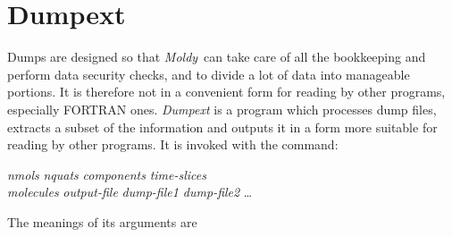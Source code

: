 \documentclass[a4paper,twoside]{report}
\newcommand{\moldy}{\emph{Moldy}}
\begin{document}
\section{Dumpext}%
Dumps are designed so that \moldy\ can take care of all the
bookkeeping and perform data security checks, and to divide a lot of data
into manageable portions.  It is therefore not in a convenient form
for reading by other programs, especially FORTRAN ones.
\emph{Dumpext} is a program which processes dump files, extracts a
subset of the information and outputs it in a form more suitable for
reading by other programs.  It is invoked with the command:
\begin{center}
 \textit{nmols}  \textit{nquats} 
 \textit{components}
\Lit{[-t} \textit{time-slices}\Lit{]} \\
\Lit{[-m} \textit{molecules}\Lit{]}
\Lit{[-v]} 
\Lit{[-o} \textit{output-file}\Lit{]}
\Lit{[-b]} 
\textit{dump-file1 dump-file2} \ldots
\end{center}
The meanings of its arguments are
\end{document}
